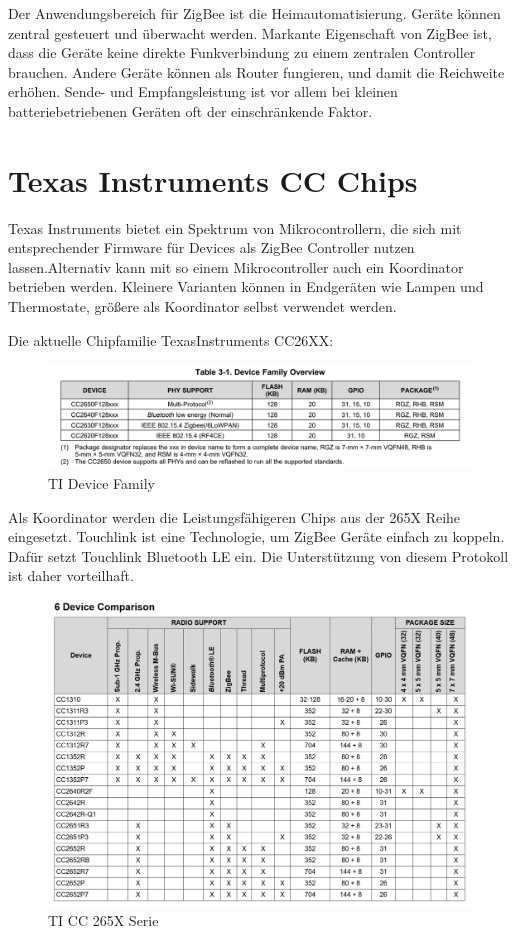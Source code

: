 Der Anwendungsbereich für ZigBee ist die Heimautomatisierung. Geräte können zentral gesteuert und überwacht werden. 
Markante Eigenschaft von ZigBee ist, dass die Geräte keine direkte Funkverbindung
zu einem zentralen Controller brauchen. Andere Geräte können als Router fungieren, und damit die Reichweite erhöhen. Sende- und Empfangsleistung
ist vor allem bei kleinen batteriebetriebenen Geräten oft der einschränkende Faktor.


\section{Texas Instruments CC Chips}

Texas Instruments bietet ein Spektrum von Mikrocontrollern, die sich mit entsprechender Firmware für Devices als ZigBee Controller
nutzen lassen.Alternativ kann mit so einem Mikrocontroller auch ein Koordinator betrieben werden. Kleinere Varianten können in Endgeräten wie Lampen und Thermostate, 
größere als Koordinator selbst verwendet werden.

Die aktuelle Chipfamilie TexasInstruments CC26XX:

\begin{figure}[H]
  \centering
  \includegraphics[width=1\textwidth]{media/table26xx.png}
  \caption{TI Device Family}
\end{figure}

Als Koordinator werden die Leistungsfähigeren Chips aus der 265X Reihe eingesetzt. Touchlink ist eine Technologie, um ZigBee Geräte einfach zu koppeln. Dafür setzt
Touchlink Bluetooth LE ein. Die Unterstützung von diesem Protokoll ist daher vorteilhaft.

\begin{figure}[H]
  \centering
  \includegraphics[width=1\textwidth]{media/table265x.png}
  \caption{TI CC 265X Serie}
\end{figure}

